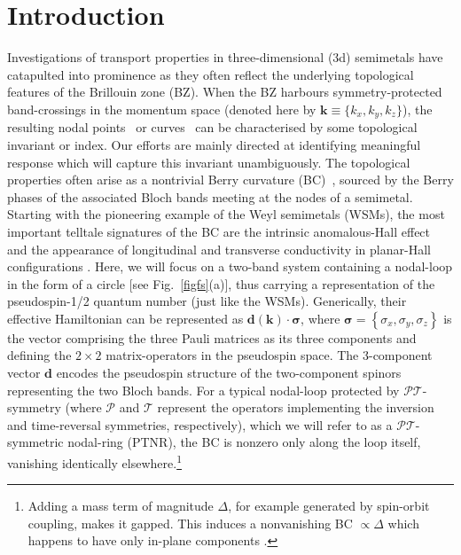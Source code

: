 \documentclass[aps,prb,onecolumn,nofootinbib,citeautoscript,10pt]{revtex4-2}
\newcommand{\bs}[1]{\boldsymbol{#1}}
\begin{document}
\section{Introduction}

Investigations of transport properties in three-dimensional (3d) semimetals have catapulted into prominence as they often reflect the underlying topological features of the Brillouin zone (BZ). When the BZ harbours symmetry-protected band-crossings in the momentum space (denoted here by $\bs k \equiv \lbrace k_x, k_y, k_z \rbrace $), the resulting nodal points~\cite{burkov11_Weyl, yan17_topological, bernevig, grushin-multifold} or curves~\cite{balents-nodal, vortex-nrsm} can be characterised by some topological invariant or index. Our efforts are mainly directed at identifying meaningful response which will capture this invariant unambiguously. The topological properties often arise as a nontrivial Berry curvature (BC)~\cite{xiao_review, sundaram99_wavepacket,graf-Nband, graf_thesis}, sourced by the Berry phases of the associated Bloch bands meeting at the nodes of a semimetal. Starting with the pioneering example of the Weyl semimetals (WSMs), the most important telltale signatures of the BC are the intrinsic anomalous-Hall effect~\cite{haldane04_berry,goswami13_axionic, burkov14_anomolous} and the appearance of longitudinal and transverse conductivity in planar-Hall configurations \cite{zhang16_linear, chen16_thermoelectric, nandy_2017_chiral, ips-mwsm-floquet, amit_magneto, das20_thermal, ips-kush-review, ips-ruiz, ips-tilted, ips-rsw-ph, ips-shreya, ips-spin1-ph, timm, ips-exact-spin1, ips-exact-rsw, ips-exact-kwn, li2023_planar, ips-nlsm-ph, ips-gnr-strain}. Here, we will focus on a two-band system containing a nodal-loop in the form of a circle [see Fig.~\ref{figfs}(a)], thus carrying a representation of the pseudospin-1/2 quantum number (just like the WSMs). Generically, their effective Hamiltonian can be represented as $\boldsymbol{d} (\bm k) \cdot \boldsymbol \sigma$, where $ \boldsymbol{\sigma} = \left\lbrace \sigma_x,\sigma_y,\sigma_z\right \rbrace $ is the vector comprising the three Pauli matrices as its three components and defining the $2\times 2$ matrix-operators in the pseudospin space. The 3-component vector $\bs d$ encodes the pseudospin structure of the two-component spinors representing the two Bloch bands. For a typical nodal-loop protected by $\mathcal P \mathcal T$-symmetry (where $\mathcal P$ and $\mathcal T$ represent the operators implementing the inversion and time-reversal symmetries, respectively), which we will refer to as a $\mathcal P \mathcal T$-symmetric nodal-ring (PTNR), the BC is nonzero only along the loop itself, vanishing identically elsewhere.\footnote{Adding a mass term of magnitude $\Delta $, for example generated by spin-orbit coupling, makes it gapped. This induces a nonvanishing BC $\propto \Delta$ which happens to have only in-plane components \cite{schnyder_nodal, yang1, yang_review_nlsm, chen_nlsm, ips-magnus, flores, li2023_planar, claudia_nlsm, enke, ips-nlsm-ph, ips-gnr-strain}.}
\end{document}
